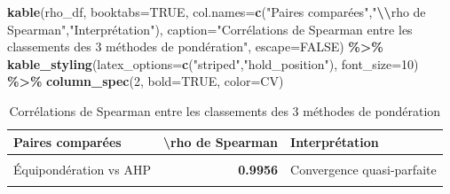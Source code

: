 \documentclass[
]{article}
\newenvironment{Shaded}{\begin{snugshade}}{\end{snugshade}}
\newcommand{\AttributeTok}[1]{\textcolor[rgb]{0.13,0.29,0.53}{#1}}
\newcommand{\ConstantTok}[1]{\textcolor[rgb]{0.56,0.35,0.01}{#1}}
\newcommand{\DecValTok}[1]{\textcolor[rgb]{0.00,0.00,0.81}{#1}}
\newcommand{\FunctionTok}[1]{\textcolor[rgb]{0.13,0.29,0.53}{\textbf{#1}}}
\newcommand{\NormalTok}[1]{#1}
\newcommand{\SpecialCharTok}[1]{\textcolor[rgb]{0.81,0.36,0.00}{\textbf{#1}}}
\newcommand{\StringTok}[1]{\textcolor[rgb]{0.31,0.60,0.02}{#1}}
\begin{document}
\begin{Shaded}
\begin{Highlighting}[]
\FunctionTok{kable}\NormalTok{(rho\_df, }\AttributeTok{booktabs=}\ConstantTok{TRUE}\NormalTok{,}
      \AttributeTok{col.names=}\FunctionTok{c}\NormalTok{(}\StringTok{"Paires comparées"}\NormalTok{,}\StringTok{"}\SpecialCharTok{\textbackslash{}\textbackslash{}}\StringTok{rho de Spearman"}\NormalTok{,}\StringTok{"Interprétation"}\NormalTok{),}
      \AttributeTok{caption=}\StringTok{"Corrélations de Spearman entre les classements des 3 méthodes de pondération"}\NormalTok{,}
      \AttributeTok{escape=}\ConstantTok{FALSE}\NormalTok{) }\SpecialCharTok{\%\textgreater{}\%}
  \FunctionTok{kable\_styling}\NormalTok{(}\AttributeTok{latex\_options=}\FunctionTok{c}\NormalTok{(}\StringTok{"striped"}\NormalTok{,}\StringTok{"hold\_position"}\NormalTok{), }\AttributeTok{font\_size=}\DecValTok{10}\NormalTok{) }\SpecialCharTok{\%\textgreater{}\%}
  \FunctionTok{column\_spec}\NormalTok{(}\DecValTok{2}\NormalTok{, }\AttributeTok{bold=}\ConstantTok{TRUE}\NormalTok{, }\AttributeTok{color=}\NormalTok{CV)}
\end{Highlighting}
\end{Shaded}

\begingroup\fontsize{10}{12}\selectfont

\begin{longtable}[t]{l>{}rl}
\caption{\label{tab:spearman}Corrélations de Spearman entre les classements des 3 méthodes de pondération}\\
\toprule
Paires comparées & \textbackslash{}rho de Spearman & Interprétation\\
\midrule
\cellcolor{gray!10}{Équipondération vs ACP} & \textcolor[HTML]{B92346}{\textbf{\cellcolor{gray!10}{0.9956}}} & \cellcolor{gray!10}{Convergence quasi-parfaite}\\
Équipondération vs AHP & \textcolor[HTML]{B92346}{\textbf{0.9956}} & Convergence quasi-parfaite\\
\cellcolor{gray!10}{ACP vs AHP} & \textcolor[HTML]{B92346}{\textbf{\cellcolor{gray!10}{1.0000}}} & \cellcolor{gray!10}{Convergence quasi-parfaite}\\
\bottomrule
\end{longtable}
\endgroup{}

\begin{Shaded}
\end{Shaded}
\end{document}
